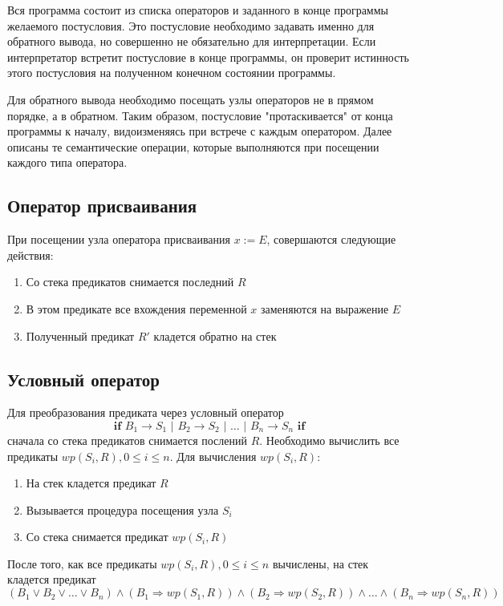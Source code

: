 Вся программа состоит из списка операторов и заданного в конце программы желаемого постусловия. Это постусловие
необходимо задавать именно для обратного вывода, но совершенно не обязательно для интерпретации. Если
интерпретатор встретит постусловие в конце программы, он проверит истинность этого постусловия на полученном конечном состоянии программы.

Для обратного вывода необходимо посещать узлы операторов не в прямом порядке, а в обратном. Таким образом,
постусловие "протаскивается" от конца программы к началу, видоизменяясь при встрече с каждым оператором.
Далее описаны те семантические операции, которые выполняются при посещении каждого типа оператора.

\subsection{Оператор присваивания}
При посещении узла оператора присваивания $x := E$, совершаются следующие действия:
\begin{enumerate}
    \item Со стека предикатов снимается последний $R$
    \item В этом предикате все вхождения переменной $x$ заменяются на выражение $E$
    \item Полученный предикат $R'$ кладется обратно на стек
\end{enumerate}

\subsection{Условный оператор}
\newcommand{\IF}{\textbf{if } B_1 \rightarrow S_1 \text{ | } B_2 \rightarrow S_2 \text{ | } \ldots \text{ | } B_n \rightarrow S_n \textbf{ if}}
Для преобразования предиката через условный оператор
\begin{equation}
    \IF
\end{equation}
сначала со стека предикатов снимается послений $R$. Необходимо вычислить все предикаты $wp(S_i, R), 0\leq i\leq n$.
Для вычисления $wp(S_i, R)$:
\begin{enumerate}
    \item На стек кладется предикат $R$
    \item Вызывается процедура посещения узла $S_i$
    \item Со стека снимается предикат $wp(S_i, R)$
\end{enumerate}

После того, как все предикаты $wp(S_i, R), 0\leq i \leq n$ вычислены,
на стек кладется предикат 
\begin{equation}
    (B_1 \vee B_2 \vee \ldots \vee B_n) \wedge (B_1 \Rightarrow wp(S_1, R)) \wedge (B_2 \Rightarrow wp(S_2, R)) \wedge
    \ldots \wedge (B_n \Rightarrow wp(S_n, R))
\end{equation}


